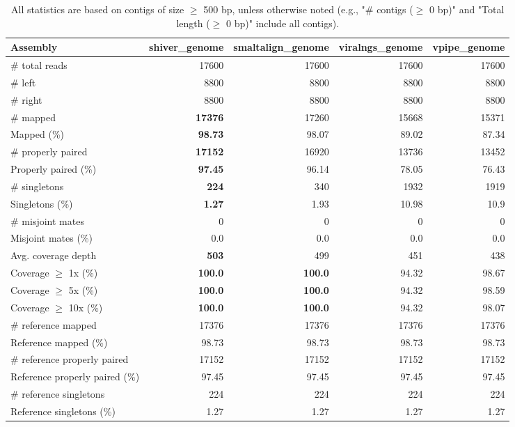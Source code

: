 \documentclass[12pt,a4paper]{article}
\begin{document}
\begin{table}[ht]
\begin{center}
\caption{All statistics are based on contigs of size $\geq$ 500 bp, unless otherwise noted (e.g., "\# contigs ($\geq$ 0 bp)" and "Total length ($\geq$ 0 bp)" include all contigs).}
\begin{tabular}{|l*{4}{|r}|}
\hline
Assembly & shiver\_genome & smaltalign\_genome & viralngs\_genome & vpipe\_genome \\ \hline
\# total reads & 17600 & 17600 & 17600 & 17600 \\ \hline
\# left & 8800 & 8800 & 8800 & 8800 \\ \hline
\# right & 8800 & 8800 & 8800 & 8800 \\ \hline
\# mapped & {\bf 17376} & 17260 & 15668 & 15371 \\ \hline
Mapped (\%) & {\bf 98.73} & 98.07 & 89.02 & 87.34 \\ \hline
\# properly paired & {\bf 17152} & 16920 & 13736 & 13452 \\ \hline
Properly paired (\%) & {\bf 97.45} & 96.14 & 78.05 & 76.43 \\ \hline
\# singletons & {\bf 224} & 340 & 1932 & 1919 \\ \hline
Singletons (\%) & {\bf 1.27} & 1.93 & 10.98 & 10.9 \\ \hline
\# misjoint mates & 0 & 0 & 0 & 0 \\ \hline
Misjoint mates (\%) & 0.0 & 0.0 & 0.0 & 0.0 \\ \hline
Avg. coverage depth & {\bf 503} & 499 & 451 & 438 \\ \hline
Coverage $\geq$ 1x (\%) & {\bf 100.0} & {\bf 100.0} & 94.32 & 98.67 \\ \hline
Coverage $\geq$ 5x (\%) & {\bf 100.0} & {\bf 100.0} & 94.32 & 98.59 \\ \hline
Coverage $\geq$ 10x (\%) & {\bf 100.0} & {\bf 100.0} & 94.32 & 98.07 \\ \hline
\# reference mapped & 17376 & 17376 & 17376 & 17376 \\ \hline
Reference mapped (\%) & 98.73 & 98.73 & 98.73 & 98.73 \\ \hline
\# reference properly paired & 17152 & 17152 & 17152 & 17152 \\ \hline
Reference properly paired (\%) & 97.45 & 97.45 & 97.45 & 97.45 \\ \hline
\# reference singletons & 224 & 224 & 224 & 224 \\ \hline
Reference singletons (\%) & 1.27 & 1.27 & 1.27 & 1.27 \\ \hline

\end{tabular}
\end{center}
\end{table}
\end{document}
